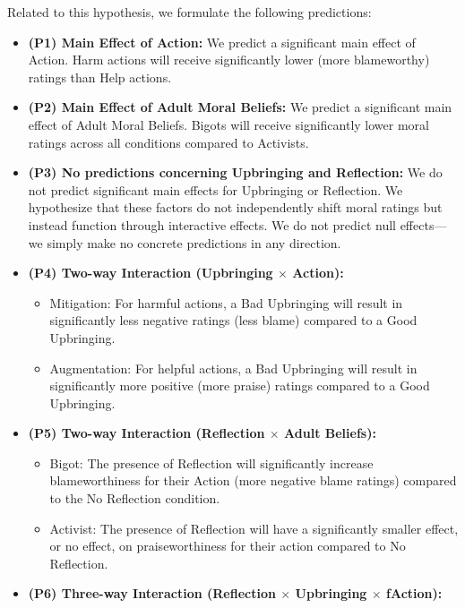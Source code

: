 \documentclass[scrarticle]{scrartcl}
\begin{document}
\vspace{0.75em}
\noindent Related to this hypothesis, we formulate the following predictions:

\begin{itemize}
   \item[--] \textsf{\textbf{(P1) Main Effect of Action:}} We predict a significant main effect of Action. Harm actions will receive significantly lower (more blameworthy) ratings than Help actions.
   \item[--] \textsf{\textbf{(P2) Main Effect of Adult Moral Beliefs:}} We predict a significant main effect of Adult Moral Beliefs. Bigots will receive significantly lower moral ratings across all conditions compared to Activists.
   \item[--] \textsf{\textbf{(P3) No predictions concerning Upbringing and Reflection:}} We do not predict significant main effects for Upbringing or Reflection. We hypothesize that these factors do not independently shift moral ratings but instead function through interactive effects. We do not predict null effects---we simply make no concrete predictions in any direction.
   \item[--] \textsf{\textbf{(P4) Two-way Interaction (Upbringing $\times$ Action):}}
   \begin{itemize}
      \item[--] Mitigation: For harmful actions, a Bad Upbringing will result in significantly less negative ratings (less blame) compared to a Good Upbringing.
      \item[--] Augmentation: For helpful actions, a Bad Upbringing will result in significantly more positive (more praise) ratings compared to a Good Upbringing.
   \end{itemize}
   \item[--] \textsf{\textbf{(P5) Two-way Interaction (Reflection $\times$ Adult Beliefs):}}
   \begin{itemize}
      \item[--] Bigot: The presence of Reflection will significantly increase blameworthiness for their Action (more negative blame ratings) compared to the No Reflection condition.
      \item[--] Activist: The presence of Reflection will have a significantly smaller effect, or no effect, on praiseworthiness for their action compared to No Reflection.
   \end{itemize}
   \item[--] \textsf{\textbf{(P6) Three-way Interaction (Reflection $\times$ Upbringing $\times$ fAction):}}

\end{itemize}
\end{document}
